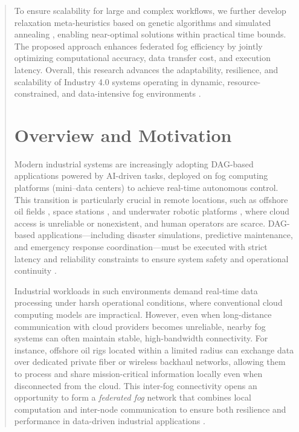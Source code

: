 \documentclass[conference]{IEEEtran}
\begin{document}
\begin{abstract}
To ensure scalability for large and complex workflows, we further develop relaxation meta-heuristics based on genetic algorithms and simulated annealing \cite{kumar2023workload}, enabling near-optimal solutions within practical time bounds. The proposed approach enhances federated fog efficiency by jointly optimizing computational accuracy, data transfer cost, and execution latency. Overall, this research advances the adaptability, resilience, and scalability of Industry 4.0 systems operating in dynamic, resource-constrained, and data-intensive fog environments \cite{fgcs2024}.


\section{Overview and Motivation}

Modern industrial systems are increasingly adopting DAG-based applications powered by AI-driven tasks, deployed on fog computing platforms (mini–data centers) to achieve real-time autonomous control. This transition is particularly crucial in remote locations, such as offshore oil fields \cite{hussain2024resource}, space stations \cite{rehman2018}, and underwater robotic platforms \cite{kabanov2022}, where cloud access is unreliable or nonexistent, and human operators are scarce. DAG-based applications—including disaster simulations, predictive maintenance, and emergency response coordination—must be executed with strict latency and reliability constraints to ensure system safety and operational continuity \cite{wang2021adaptive, rehman2018, cai2019}.

Industrial workloads in such environments demand real-time data processing under harsh operational conditions, where conventional cloud computing models are impractical. However, even when long-distance communication with cloud providers becomes unreliable, nearby fog systems can often maintain stable, high-bandwidth connectivity. For instance, offshore oil rigs located within a limited radius can exchange data over dedicated private fiber or wireless backhaul networks, allowing them to process and share mission-critical information locally even when disconnected from the cloud. This inter-fog connectivity opens an opportunity to form a \textit{federated fog} network that combines local computation and inter-node communication to ensure both resilience and performance in data-driven industrial applications \cite{mattia2023fogcontrol}.


\end{abstract}
\end{document}
